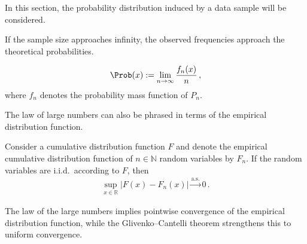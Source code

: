     In this section, the probability distribution induced by a data sample will be considered.


    \begin{theorem}\label{statistics:large_numbers}
        If the sample size approaches infinity, the observed frequencies approach the theoretical probabilities.
    \end{theorem}
    \begin{result}
        \begin{gather}
            \label{statistics:frequentist_probability}
            \Prob(x) := \lim_{n\rightarrow\infty}\frac{f_n(x)}{n}\,,
        \end{gather}
        where $f_n$ denotes the probability mass function of $P_n$.
    \end{result}

    The law of large numbers can also be phrased in terms of the empirical distribution function.
    \begin{theorem}\label{statistics:glivenko_cantelli}
        Consider a cumulative distribution function $F$ and denote the empirical cumulative distribution function of $n\in\mathbb{N}$ random variables by $F_n$. If the random variables are i.i.d.~according to $F$, then
        \begin{gather}
            \sup_{x\in\mathbb{R}}|F(x)-F_n(x)|\overset{\text{a.s.}}{\longrightarrow}0\,.
        \end{gather}
    \end{theorem}
    \begin{remark}
        The law of the large numbers implies pointwise convergence of the empirical distribution function, while the Glivenko--Cantelli theorem strengthens this to uniform convergence.
    \end{remark}

